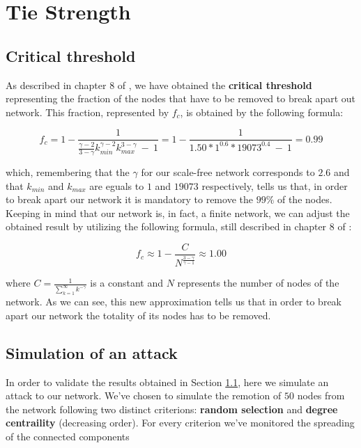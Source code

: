 \chapter{Tie Strength} %
\label{cha:tie_strength}
    \section{Critical threshold} %
    \label{sec:critical_threshold}
        As described in chapter 8 of \cite{network_science}, we have obtained the \textbf{critical threshold}
        representing the fraction of the nodes that have to be removed to break apart out network. This fraction,
        represented by $f_c$, is obtained by the following formula:

        \begin{equation*}
            f_c = 1 - \frac{1}
            {\frac{\gamma - 2}{3 - \gamma}k^{\gamma - 2}_{\mathit{min}}k^{3 - \gamma}_{\mathit{max}} \ - \  1} =
            1 - \frac{1}{1.50 * 1^{0.6} * 19073^{0.4} \ - \ 1} = 0.99
        \end{equation*}

        which, remembering that the $\gamma$ for our scale-free network corresponds to $2.6$ and that
        $k_{\mathit{min}}$ and $k_{\mathit{max}}$ are eguals to $1$ and $19073$ respectively, tells us that, in
        order to break apart our network it is mandatory to remove the $99\%$ of the nodes. Keeping in mind that
        our network is, in fact, a finite network, we can adjust the obtained result by utilizing the following
        formula, still described in chapter 8 of \cite{network_science}:

        \begin{equation*}
            f_c \approx 1 - \frac{C}{N^{\frac{3 - \gamma}{\gamma - 1}}} \approx 1.00
        \end{equation*}

        where $C = \frac{1}{\sum_{k=1}^{\infty}k^{-\gamma}}$ is a constant and $N$ represents the number of nodes
        of the network. As we can see, this new approximation tells us that in order to break apart our network the
        totality of its nodes has to be removed.
    \section{Simulation of an attack} %
    \label{sec:simulation_of_an_attack}
        In order to validate the results obtained in Section \ref{sec:critical_threshold}, here we simulate an
        attack to our network. We've chosen to simulate the remotion of $50$ nodes from the network following two
        distinct criterions: \textbf{random selection} and \textbf{degree centraility} (decreasing order). For every
        criterion we've monitored the spreading of the connected components

